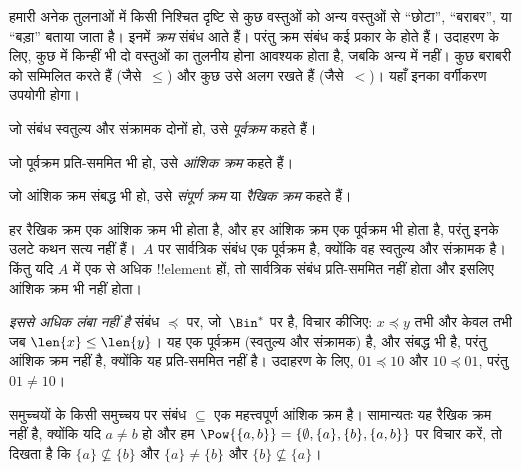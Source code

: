 \documentclass[../../../include/open-logic-section]{subfiles}
\begin{document}

\begin{explain}
हमारी अनेक तुलनाओं में किसी निश्चित दृष्टि से कुछ वस्तुओं को अन्य वस्तुओं से
“छोटा”, “बराबर”, या “बड़ा” बताया जाता है। इनमें \emph{क्रम} संबंध आते
हैं। परंतु क्रम संबंध कई प्रकार के होते हैं। उदाहरण के लिए, कुछ में किन्हीं
भी दो वस्तुओं का तुलनीय होना आवश्यक होता है, जबकि अन्य में नहीं। कुछ बराबरी
को सम्मिलित करते हैं (जैसे~$\le$) और कुछ उसे अलग रखते हैं (जैसे~$<$)। यहाँ
इनका वर्गीकरण उपयोगी होगा।
\end{explain}

\begin{defn}[पूर्वक्रम]
जो संबंध स्वतुल्य और संक्रामक दोनों हो, उसे
\emph{पूर्वक्रम} कहते हैं।  
\end{defn}

\begin{defn}[आंशिक क्रम]
जो पूर्वक्रम प्रति-सममित भी हो, उसे
\emph{आंशिक क्रम} कहते हैं।
\end{defn}

\begin{defn}[रैखिक क्रम]
जो आंशिक क्रम संबद्ध भी हो, उसे
\emph{संपूर्ण क्रम} या \emph{रैखिक क्रम} कहते हैं।
\end{defn}

\begin{ex}
हर रैखिक क्रम एक आंशिक क्रम भी होता है, और हर आंशिक क्रम एक पूर्वक्रम भी
होता है, परंतु इनके उलटे कथन सत्य नहीं हैं।~$A$ पर सार्वत्रिक संबंध एक
पूर्वक्रम है, क्योंकि वह स्वतुल्य और संक्रामक है। किंतु यदि
$A$ में एक से अधिक !!{element} हों, तो सार्वत्रिक संबंध
प्रति-सममित नहीं होता और इसलिए आंशिक क्रम भी नहीं होता।
\end{ex}

\begin{ex}
\emph{इससे अधिक लंबा नहीं है} संबंध $\preccurlyeq$ पर, जो~$\Bin^*$ पर है,
विचार कीजिए: $x \preccurlyeq y$ तभी और केवल तभी जब $\len{x} \le \len{y}$। यह एक
पूर्वक्रम (स्वतुल्य और संक्रामक) है, और संबद्ध भी है, परंतु आंशिक क्रम नहीं
है, क्योंकि यह प्रति-सममित नहीं है। उदाहरण के लिए, $01
\preccurlyeq 10$ और $10 \preccurlyeq 01$, परंतु $01 \neq 10$।
\end{ex}

\begin{ex}
समुच्चयों के किसी समुच्चय पर संबंध $\subseteq$ एक महत्त्वपूर्ण आंशिक क्रम
है। सामान्यतः यह रैखिक क्रम नहीं है, क्योंकि यदि $a \neq b$ हो और हम
$\Pow{\{a, b\}} = \{\emptyset, \{a\}, \{b\}, \{a,b\}\}$ पर विचार करें, तो
दिखता है कि $\{a\} \nsubseteq \{b\}$ और $\{a\} \neq \{b\}$ और $\{b\}
\nsubseteq \{a\}$।
\end{ex}
\end{document}
